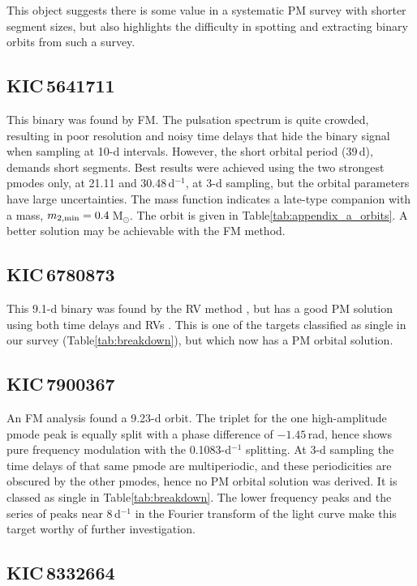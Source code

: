 \documentclass[a4paper,fleqn,usenatbib]{mnras}
\begin{document}
This object suggests there is some value in a systematic PM survey with shorter segment sizes, but also highlights the difficulty in spotting and extracting binary orbits from such a survey.


\subsection{KIC\,5641711} %

This binary was found by FM. The pulsation spectrum is quite crowded, resulting in poor resolution and noisy time delays that hide the binary signal when sampling at 10-d intervals. However, the short orbital period (39\,d), demands short segments. Best results were achieved using the two strongest p\:modes only, at 21.11 and 30.48\,d$^{-1}$, at 3-d sampling, but the orbital parameters have large uncertainties. The mass function indicates a late-type companion with a mass, $m_{\rm 2,min} = 0.4$\,M$_{\odot}$. The orbit is given in Table\:\ref{tab:appendix_a_orbits}. A better solution may be achievable with the FM method.


\subsection{KIC\,6780873} %

This 9.1-d binary was found by the RV method \citep{nemecetal2017}, but has a good PM solution using both time delays and RVs \citep{murphyetal2016b}. This is one of the targets classified as single in our survey (Table\:\ref{tab:breakdown}), but which now has a PM orbital solution.


\subsection{KIC\,7900367} %

An FM analysis found a 9.23-d orbit. The triplet for the one high-amplitude p\:mode peak is equally split with a phase difference of $-1.45$\,rad, hence shows pure frequency modulation with the 0.1083-d$^{-1}$ splitting. At 3-d sampling the time delays of that same p\:mode are multiperiodic, and these periodicities are obscured by the other p\:modes, hence no PM orbital solution was derived. It is classed as single in Table\:\ref{tab:breakdown}. The lower frequency peaks and the series of peaks near 8\,d$^{-1}$ in the Fourier transform of the light curve make this target worthy of further investigation.


\subsection{KIC\,8332664} %
\end{document}
